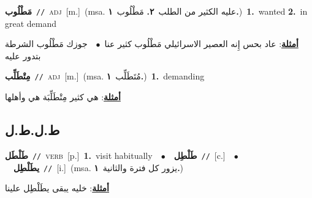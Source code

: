\documentclass[10pt,a4paper,twoside]{article} %
\begin{document}
\begin{multicols}{2}
{\setlength\topsep{0pt}\textbf{\foreignlanguage{arabic}{مَطْلُوب}}\ {\color{gray}\texttt{//}\color{black}}\ \textsc{adj}\ [m.]\ \color{gray}(msa. \foreignlanguage{arabic}{عليه الكثير من الطلب}~\foreignlanguage{arabic}{\textbf{٢.}}  \foreignlanguage{arabic}{مَطْلُوب}~\foreignlanguage{arabic}{\textbf{١.}})\color{black}\ \textbf{1.}~wanted  \textbf{2.}~in great demand\  \begin{flushright}\color{gray}\foreignlanguage{arabic}{\textbf{\underline{\foreignlanguage{arabic}{أمثلة}}}: عاد بحس إِنه العصير الاسرائيلي مَطْلُوب كثير عنا\ $\bullet$\ \  جوزك مَطْلُوب الشرطة بتدور عليه}\end{flushright}\color{black}} \vspace{2mm}

{\setlength\topsep{0pt}\textbf{\foreignlanguage{arabic}{مِتْطَلِّب}}\ {\color{gray}\texttt{//}\color{black}}\ \textsc{adj}\ [m.]\ \color{gray}(msa. \foreignlanguage{arabic}{مُتَطَلِّب}~\foreignlanguage{arabic}{\textbf{١.}})\color{black}\ \textbf{1.}~demanding\  \begin{flushright}\color{gray}\foreignlanguage{arabic}{\textbf{\underline{\foreignlanguage{arabic}{أمثلة}}}: هي كثير مِتْطَلِّبَة هي وأهلها}\end{flushright}\color{black}} \vspace{2mm}

\vspace{-3mm}
\subsection*{\color{blue}\foreignlanguage{arabic}{ط.ل.ط.ل}\color{blue}{}} 

{\setlength\topsep{0pt}\textbf{\foreignlanguage{arabic}{طَلْطَل}}\ {\color{gray}\texttt{//}\color{black}}\ \textsc{verb}\ [p.]\ \textbf{1.}~visit habitually\ \ $\bullet$\ \ \setlength\topsep{0pt}\textbf{\foreignlanguage{arabic}{طَلْطِل}}\ {\color{gray}\texttt{//}\color{black}}\ [c.]\ \ $\bullet$\ \ \setlength\topsep{0pt}\textbf{\foreignlanguage{arabic}{يطَلْطِل}}\ {\color{gray}\texttt{//}\color{black}}\ [i.]\ \color{gray}(msa. \foreignlanguage{arabic}{يزور كل فترة والثانية}~\foreignlanguage{arabic}{\textbf{١.}})\color{black}\  \begin{flushright}\color{gray}\foreignlanguage{arabic}{\textbf{\underline{\foreignlanguage{arabic}{أمثلة}}}: خليه يبقى يطَلْطِل علينا}\end{flushright}\color{black}} \vspace{2mm}


\end{multicols}
\end{document}
